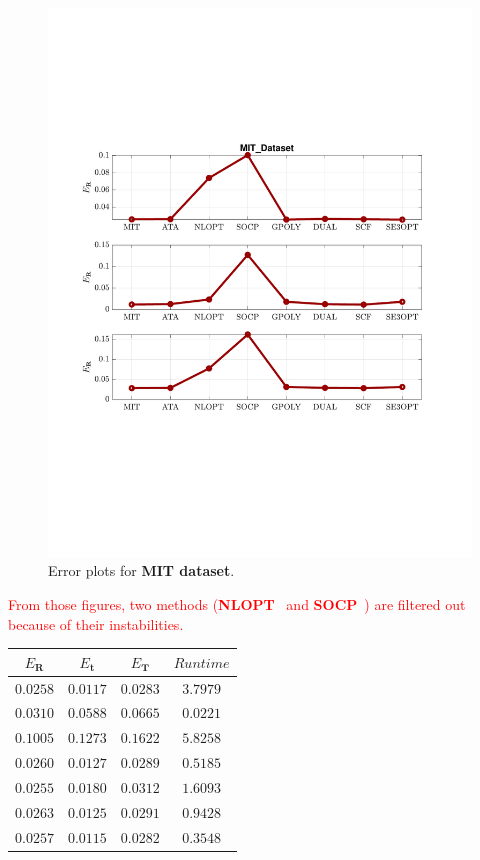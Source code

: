 \documentclass[a4paper]{report}
\begin{document}
\begin{figure}
\centering
\includegraphics[scale=0.7]{./hand_eye_figures/real/adv_Result_MIT_Dataset}
\caption{Error plots for \textbf{MIT dataset}.}
\end{figure}

\textcolor{red}{
From those figures, two methods (\textbf{NLOPT}~\cite{horaud1995hand} and \textbf{SOCP}~\cite{zhao2011hand}) are filtered out because of their instabilities. } 

\begin{table}
\centering
\begin{tabular}{c|c|c|c}
$E_{\mathbf{R}}$ & $E_{\mathbf{t}}$ & $E_{\mathbf{T}}$ & $Runtime$\\ \hline
    $0.0258$ &   $0.0117$  &  $0.0283$ &  $3.7979$ \\ \hline
    $0.0310$ &   $0.0588$  &  $0.0665$ &  $0.0221$ \\ \hline
    $0.1005$ &   $0.1273$  &  $0.1622$ &  $5.8258$ \\ \hline
    $0.0260$ &   $0.0127$  &  $0.0289$ &  $0.5185$ \\ \hline
    $0.0255$ &   $0.0180$  &  $0.0312$ &  $1.6093$ \\ \hline
    $0.0263$ &   $0.0125$  &  $0.0291$ &  $0.9428$ \\ \hline
    $0.0257$ &   $0.0115$  &  $0.0282$ &  $0.3548$ \\ \hline                     
\hline
\end{tabular}
\end{table}
\end{document}
